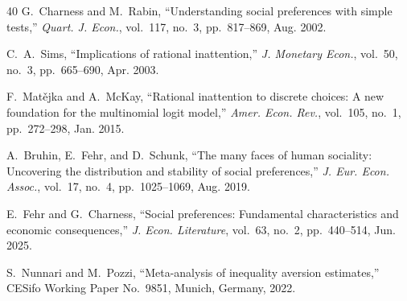 \documentclass[journal]{IEEEtran}
\begin{document}
\begin{thebibliography}{40}
G.~Charness and M.~Rabin, ``Understanding social preferences with simple tests,''
\emph{Quart. J. Econ.}, vol.~117, no.~3, pp.~817--869, Aug. 2002.

C.~A.~Sims, ``Implications of rational inattention,''
\emph{J. Monetary Econ.}, vol.~50, no.~3, pp.~665--690, Apr. 2003.

F.~Mat\v{e}jka and A.~McKay, ``Rational inattention to discrete choices: A new foundation for the multinomial logit model,''
\emph{Amer. Econ. Rev.}, vol.~105, no.~1, pp.~272--298, Jan. 2015.

A.~Bruhin, E.~Fehr, and D.~Schunk, ``The many faces of human sociality: Uncovering the distribution and stability of social preferences,''
\emph{J. Eur. Econ. Assoc.}, vol.~17, no.~4, pp.~1025--1069, Aug. 2019.

E.~Fehr and G.~Charness, ``Social preferences: Fundamental characteristics and economic consequences,''
\emph{J. Econ. Literature}, vol.~63, no.~2, pp.~440--514, Jun. 2025.

S.~Nunnari and M.~Pozzi, ``Meta-analysis of inequality aversion estimates,''
CESifo Working Paper No.~9851, Munich, Germany, 2022.

\end{thebibliography}

\balance
\end{document}
